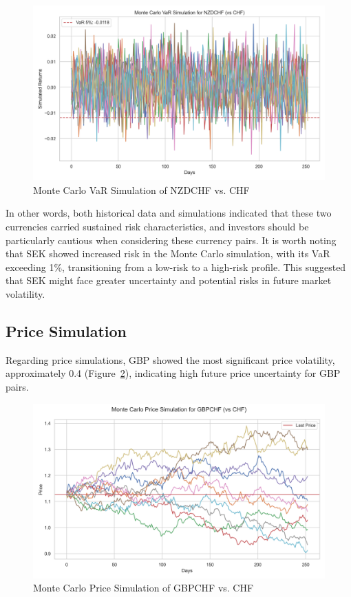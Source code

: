 \documentclass{article}
\begin{document}
\begin{figure}[H]
    \centering   \includegraphics[width=0.75\linewidth]{../../reports/figures/monte_carlo_var_simulation_NZDCHF_vs_CHF.png}
    \caption{Monte Carlo VaR Simulation of NZDCHF vs. CHF}  \label{fig:monte_carlo_var_simulation_NZDCHF_vs_CHF}
\end{figure}

In other words, both historical data and simulations indicated that these two currencies carried sustained risk characteristics, and investors should be particularly cautious when considering these currency pairs. It is worth noting that SEK showed increased risk in the Monte Carlo simulation, with its VaR exceeding 1\%, transitioning from a low-risk to a high-risk profile. This suggested that SEK might face greater uncertainty and potential risks in future market volatility.

\subsection{Price Simulation}
Regarding price simulations, GBP showed the most significant price volatility, approximately 0.4 (Figure~\ref{fig:monte_carlo_price_simulation_GBPCHF_vs_CHF}), indicating high future price uncertainty for GBP pairs. 

\begin{figure}[H]
    \centering  \includegraphics[width=0.75\linewidth]{../../reports/figures/monte_carlo_price_simulation_GBPCHF_vs_CHF.png}
    \caption{Monte Carlo Price Simulation of GBPCHF vs. CHF}  \label{fig:monte_carlo_price_simulation_GBPCHF_vs_CHF}
\end{figure}
\end{document}
